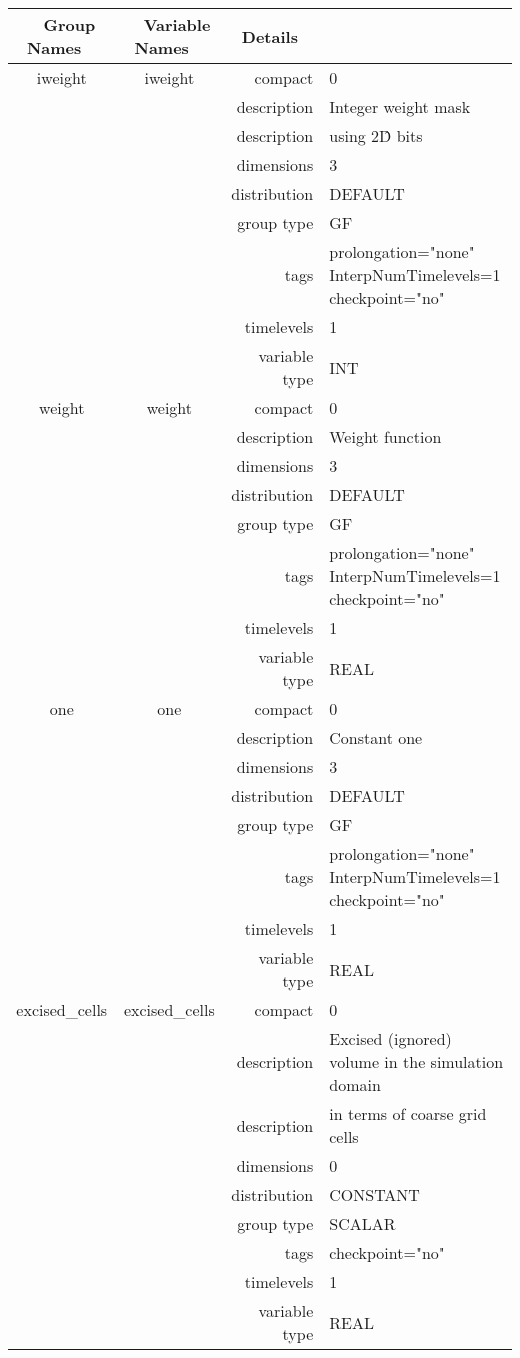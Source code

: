 \begin{tabular*}{150mm}{|c|c@{\extracolsep{\fill}}|rl|} \hline 
~ {\bf Group Names} ~ & ~ {\bf Variable Names} ~  &{\bf Details} ~ & ~\\ 
\hline 
iweight & iweight & compact & 0 \\ 
 &  & description & Integer weight mask \\ 
& ~ & description &  using 2\^D bits \\ 
 &  & dimensions & 3 \\ 
 &  & distribution & DEFAULT \\ 
 &  & group type & GF \\ 
 &  & tags & prolongation="none" InterpNumTimelevels=1 checkpoint="no" \\ 
 &  & timelevels & 1 \\ 
 &  & variable type & INT \\ 
\hline 
weight & weight & compact & 0 \\ 
 &  & description & Weight function \\ 
 &  & dimensions & 3 \\ 
 &  & distribution & DEFAULT \\ 
 &  & group type & GF \\ 
 &  & tags & prolongation="none" InterpNumTimelevels=1 checkpoint="no" \\ 
 &  & timelevels & 1 \\ 
 &  & variable type & REAL \\ 
\hline 
one & one & compact & 0 \\ 
 &  & description & Constant one \\ 
 &  & dimensions & 3 \\ 
 &  & distribution & DEFAULT \\ 
 &  & group type & GF \\ 
 &  & tags & prolongation="none" InterpNumTimelevels=1 checkpoint="no" \\ 
 &  & timelevels & 1 \\ 
 &  & variable type & REAL \\ 
\hline 
excised\_cells & excised\_cells & compact & 0 \\ 
 &  & description & Excised (ignored) volume in the simulation domain \\ 
& ~ & description &  in terms of coarse grid cells \\ 
 &  & dimensions & 0 \\ 
 &  & distribution & CONSTANT \\ 
 &  & group type & SCALAR \\ 
 &  & tags & checkpoint="no" \\ 
 &  & timelevels & 1 \\ 
 &  & variable type & REAL \\ 
\hline 
\end{tabular*} 




